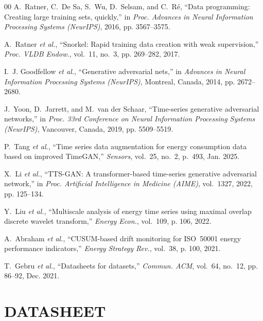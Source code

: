\documentclass[conference]{IEEEtran}
\begin{document}
\begin{thebibliography}{00}
A.~Ratner, C.~De Sa, S.~Wu, D.~Selsam, and C.~Ré,
``Data programming: Creating large training sets, quickly,''
in \emph{Proc. Advances in Neural Information Processing
Systems (NeurIPS)}, 2016, pp. 3567--3575.

A.~Ratner \emph{et al.}, ``Snorkel: Rapid training data creation
with weak supervision,'' \emph{Proc. VLDB Endow.},
vol.~11, no.~3, pp. 269--282, 2017.

I.~J. Goodfellow \emph{et al.}, ``Generative adversarial nets,''
in \emph{Advances in Neural Information Processing Systems
(NeurIPS)}, Montreal, Canada, 2014, pp. 2672--2680.

J.~Yoon, D.~Jarrett, and M.~van der Schaar, ``Time-series
generative adversarial networks,''
in \emph{Proc. 33rd
Conference on Neural Information Processing Systems (NeurIPS)},
Vancouver, Canada, 2019, pp. 5509--5519.

P.~Tang \emph{et al.}, ``Time series data augmentation for
energy consumption data based on improved TimeGAN,''
\emph{Sensors}, vol.~25, no.~2, p.~493, Jan. 2025.

X.~Li \emph{et al.}, ``TTS-GAN: A transformer-based time-series
generative adversarial network,''
in \emph{Proc. Artificial Intelligence in Medicine (AIME)},
vol.~1327, 2022, pp. 125--134.

Y.~Liu \emph{et al.}, ``Multiscale analysis of energy time series
using maximal overlap discrete wavelet transform,''
\emph{Energy Econ.}, vol.~109, p. 106, 2022.

A.~Abraham \emph{et al.}, ``CUSUM-based drift monitoring for
ISO~50001 energy performance indicators,''
\emph{Energy Strategy Rev.}, vol.~38, p. 100, 2021.

T.~Gebru \emph{et al.}, ``Datasheets for datasets,''
\emph{Commun. ACM}, vol.~64, no.~12, pp. 86--92, Dec. 2021.

\end{thebibliography}

\newpage
\appendices

\section{DATASHEET}
\label{app:datasheet}
\end{document}
